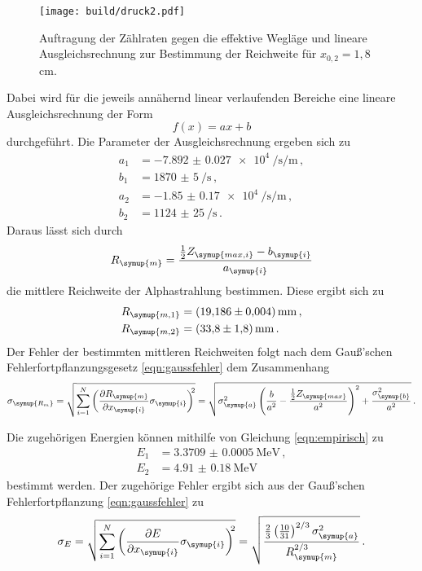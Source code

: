\begin{figure}[H]
  \centering
  \texttt{[image: build/druck2.pdf]}
  \caption{Auftragung der Zählraten gegen die effektive Wegläge und lineare Ausgleichsrechnung
  zur Bestimmung der Reichweite für $x_{0,2}=1{,}8\,$cm.}
  \label{fig:druck2}
\end{figure}

Dabei wird für die jeweils annähernd linear verlaufenden Bereiche eine lineare Ausgleichsrechnung
der Form
\begin{equation}
  f(x)=ax+b
\end{equation}
durchgeführt. Die Parameter der Ausgleichsrechnung ergeben sich zu
\begin{align*}
  a_1 &= \SI{-7.892(0027)e4}{\per\second\per\meter}\,, \\
  b_1 &= \SI{1870(5)}{\per\second}\,,  \\
  a_2 &= \SI{-1.85(017)e4}{\per\second\per\meter} \,,  \\
  b_2 &= \SI{1124(25)}{\per\second} \,.
\end{align*}
Daraus lässt sich durch
\begin{equation}
  R_{\symup{m}}=\frac{\frac{1}{2}Z_{\symup{max,i}}-b_{\symup{i}}}{a_{\symup{i}}}
\end{equation}
die mittlere Reichweite der Alphastrahlung bestimmen. Diese ergibt sich zu
\begin{align*}
  R_{\symup{m,1}}&=\SI{19.186(0004)}{\milli\meter} \,, \\
  R_{\symup{m,2}}&=\SI{33.8(18)}{\milli\meter} \,.
\end{align*}
Der Fehler der bestimmten mittleren Reichweiten folgt nach dem Gauß'schen Fehlerfortpflanzungsgesetz
\eqref{eqn:gaussfehler} dem Zusammenhang
\begin{equation}
  \sigma_{\symup{R_m}} = \sqrt{\sum\limits_{i = 1}^N\left(\frac{\partial R_{\symup{m}}}{\partial x_{\symup{i}}}
  \sigma_{\symup{i}} \right)^{\!\! 2}} = \sqrt{\sigma_{\symup{a}}^{2} \left(\frac{b}{a^{2}} -
  \frac{\frac{1}{2}Z_{\symup{max}}}{a^{2}}\right)^{2} + \frac{\sigma_{\symup{b}}^{2}}{a^{2}} } \,.
\end{equation}

Die zugehörigen Energien können mithilfe von Gleichung \eqref{eqn:empirisch} zu
\begin{align*}
  E_1&=\SI{3.3709(00005)}{\MeV} \,,\\
  E_2&=\SI{4.91(018)}{\MeV}
\end{align*}
bestimmt werden. Der zugehörige Fehler ergibt sich aus der Gauß'schen Fehlerfortpflanzung
\eqref{eqn:gaussfehler} zu
\begin{equation}
  \sigma_{E} = \sqrt{\sum\limits_{i = 1}^N\left( \frac{\partial E}{\partial x_{\symup{i}}}
   \sigma_{\symup{i}} \right)^{\!\! 2}} =
   \sqrt{\frac{\frac{2}{3}\left(\frac{10}{31}\right)^{2/3}\sigma_{\symup{a}}^{2}}{R_{\symup{m}}^{2/3}}}\,.
\end{equation}

